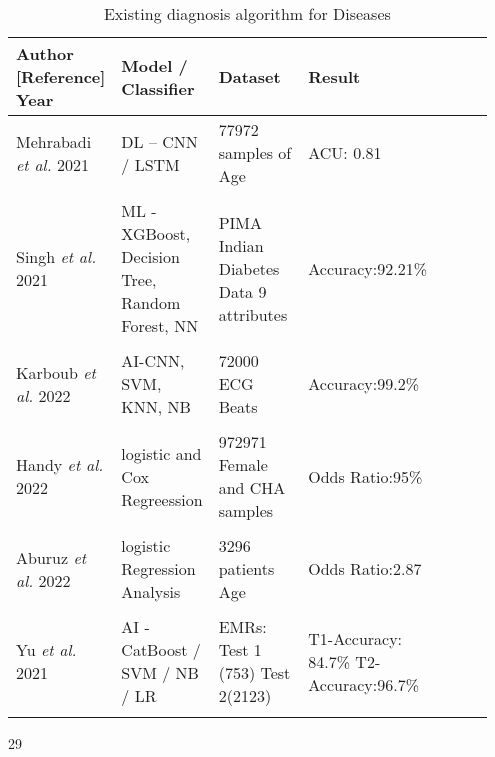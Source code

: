 \begin{table*} 
\caption{Existing diagnosis algorithm for Diseases} 
\label{tab:t2} 
\centering 
\begin{tabular} 
{p{0.20\linewidth} p{0.15\linewidth}p{0.20\linewidth}p{0.20\linewidth}p{0.20\linewidth}} 
\hline 
\textbf{Author [Reference] Year} & \textbf{Model / Classifier} & \textbf{Dataset} & \textbf{Result}\\ 
\hline 
Mehrabadi \emph{et al.} \cite{mehrabadi2021detection} 2021& 
DL – CNN / LSTM & 77972 samples of Age & ACU: 0.81 
\\\\ 
Singh \emph{et al.} \cite {singh2021ediapredict} 2021 & ML - XGBoost, Decision Tree, Random Forest, NN 
& PIMA Indian Diabetes Data 9 attributes & Accuracy:92.21\% 
\\\\ 
Karboub \emph{et al.} \cite {karboub2020automated} 2022 & AI-CNN, SVM, KNN, NB & 72000 ECG Beats 
& Accuracy:99.2\% 
\\\\ 
Handy \emph{et al.} \cite {Handy923} 2022 & 
logistic and Cox Regreession & 972971 Female and CHA samples & Odds Ratio:95\% 
\\\\ 
Aburuz \emph{et al.} \cite {aburuz2022clinical} 2022 & logistic Regression Analysis & 3296 patients Age & 
Odds Ratio:2.87 
\\\\ 
Yu \emph{et al.} \cite {yu2020role} 2021 & 
AI - CatBoost / SVM / NB / LR & EMRs: Test 1 (753) 
\newline 
Test 2(2123) 
& T1-Accuracy: 84.7\% 
\newline 
T2-Accuracy:96.7\% 
\\\\ 
\hline 
\end{tabular} 
\end{table*} 29 
